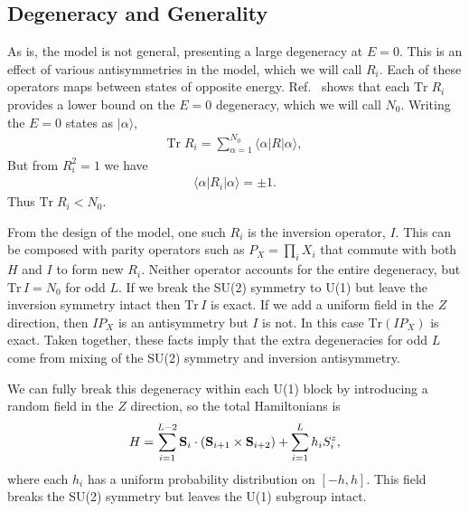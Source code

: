 \documentclass[aps,prx,reprint,superscriptaddress, longbibliography]{revtex4-1}
\newcommand{\Tr}{ \mbox{Tr}}
\begin{document}
\subsection{Degeneracy and Generality}

As is, the model is not general, presenting a large degeneracy at $E=0$. This is an effect of various antisymmetries in the model, which we will call $R_i$. Each of these operators maps between states of opposite energy. Ref.~\cite{IadecolaFSUSY} shows that each $\Tr\;R_i$ provides a lower bound on the $E=0$ degeneracy, which we will call $N_0$. Writing the $E=0$ states as $|\alpha\rangle$,
\begin{align}
\Tr\;R_i = \sum_{\alpha=1}^{N_0}\langle\alpha|R|\alpha\rangle,
\end{align}
But from $R_i^2=1$ we have
\begin{align}
\langle\alpha|R_i|\alpha\rangle=\pm 1.
\end{align}
Thus $\Tr\; R_i < N_0$.

From the design of the model, one such $R_i$ is the inversion operator, $I$. This can be composed with parity operators such as $P_X=\prod_i X_i$ that commute with both $H$ and $I$ to form new $R_i$. Neither operator accounts for the entire degeneracy, but $\Tr\,I=N_0$ for odd $L$. If we break the SU(2) symmetry to U(1) but leave the inversion symmetry intact then $\Tr\,I$ is exact. If we add a uniform field in the $Z$ direction, then $IP_X$ is an antisymmetry but $I$ is not. In this case $\Tr(IP_X)$ is exact. Taken together, these facts imply that the extra degeneracies for odd $L$ come from mixing of the SU(2) symmetry and inversion antisymmetry.


We can fully break this degeneracy within each U(1) block by introducing a random field in the $Z$ direction, so the total Hamiltonians is
\begin{align}
H = \sum_{i=1}^{L-2}{\bf S}_i\cdot({\bf S}_{i+1}\times {\bf S}_{i+2}) + 
	\sum_{i=1}^{L}h_iS_i^z,
\end{align}
where each $h_i$ has a uniform probability distribution on $[-h,h]$. This field breaks the SU(2) symmetry but leaves the U(1) subgroup intact.
\end{document}
